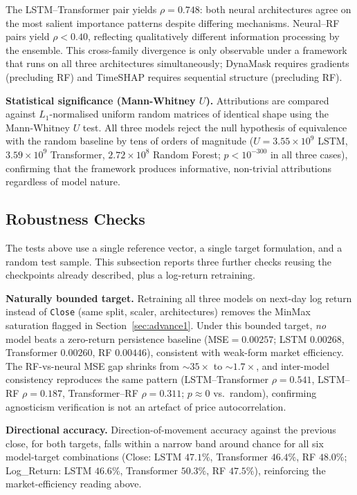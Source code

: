 \documentclass[runningheads]{llncs}
\begin{document}
The LSTM--Transformer pair yields $\rho{=}0.748$: both neural
architectures agree on the most salient importance patterns despite
differing mechanisms. Neural--RF pairs yield $\rho{<}0.40$, reflecting
qualitatively different information processing by the ensemble.
This cross-family divergence is only observable under a framework
that runs on all three architectures simultaneously; DynaMask requires
gradients (precluding RF) and TimeSHAP requires sequential structure
(precluding RF).

\textbf{Statistical significance (Mann-Whitney $U$).}
Attributions are compared against $L_1$-normalised uniform random
matrices of identical shape using the Mann-Whitney $U$ test. All
three models reject the null hypothesis of equivalence with the
random baseline by tens of orders of magnitude ($U{=}3.55{\times}10^9$
LSTM, $3.59{\times}10^9$ Transformer, $2.72{\times}10^8$ Random
Forest; $p{<}10^{-300}$ in all three cases), confirming that the
framework produces informative, non-trivial attributions regardless
of model nature.

\subsection{Robustness Checks}
\label{sec:robustness}

The tests above use a single reference vector, a single target
formulation, and a random test sample. This subsection reports three
further checks reusing the checkpoints already described, plus a
log-return retraining.

\textbf{Naturally bounded target.} Retraining all three models on
next-day log return instead of \texttt{Close} (same split, scaler,
architectures) removes the MinMax saturation flagged in
Section~\ref{sec:advance1}. Under this bounded target, \emph{no}
model beats a zero-return persistence baseline (MSE$=0.00257$; LSTM
$0.00268$, Transformer $0.00260$, RF $0.00446$), consistent with
weak-form market efficiency. The RF-vs-neural MSE gap shrinks from
${\sim}35{\times}$ to ${\sim}1.7{\times}$, and inter-model consistency
reproduces the same pattern (LSTM--Transformer $\rho{=}0.541$,
LSTM--RF $\rho{=}0.187$, Transformer--RF $\rho{=}0.311$; $p{\approx}0$
vs.\ random), confirming agnosticism verification is not an artefact
of price autocorrelation.

\textbf{Directional accuracy.} Direction-of-movement accuracy against
the previous close, for both targets, falls within a narrow band
around chance for all six model-target combinations (Close: LSTM
$47.1\%$, Transformer $46.4\%$, RF $48.0\%$; Log\_Return: LSTM
$46.6\%$, Transformer $50.3\%$, RF $47.5\%$), reinforcing the
market-efficiency reading above.
\end{document}
